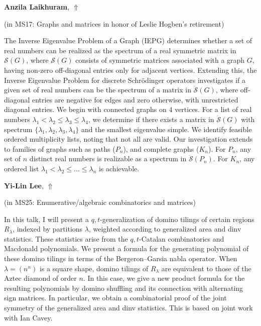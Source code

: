 \documentclass[ILAS2025-program.tex]{subfiles}
\begin{document}
\hypertarget{down0223}{}\begin{ilasabstract}
    
\textbf{Anzila Laikhuram},  \hfill \hyperlink{up0223}{$\Uparrow$}
    
    
(in {\color{mstitle}MS17: Graphs and matrices in honor of Leslie Hogben's retirement})
        
\mtskip
    The Inverse Eigenvalue Problem of a Graph (IEPG) determines whether a set of real numbers can be realized as the spectrum of a real symmetric matrix in $\mathcal{S}(G)$, where $\mathcal{S}(G)$ consists of symmetric matrices associated with a graph $G$, having non-zero off-diagonal entries only for adjacent vertices. Extending this, the Inverse Eigenvalue Problem for discrete Schr\"odinger operators investigates if a given set of real numbers can be the spectrum of a matrix in $\ddot{\mathcal{S}}(G)$, where off-diagonal entries are negative for edges and zero otherwise, with unrestricted diagonal entries. We begin with connected graphs on 4 vertices. For a list of real numbers $\lambda_1 < \lambda_2 \leq \lambda_3 \leq \lambda_4$, we determine if there exists a matrix in $\ddot{\mathcal{S}}(G)$ with spectrum $\{\lambda_1, \lambda_2, \lambda_3, \lambda_4\}$ and the smallest eigenvalue simple. We identify feasible ordered multiplicity lists, noting that not all are valid.   Our investigation extends to families of graphs such as paths ($P_n$), and complete graphs ($K_n$). For $P_n$, any set of $n$ distinct real numbers is realizable as a spectrum in $\ddot{\mathcal{S}}(P_n)$. For $K_n$, any ordered list $\lambda_1 < \lambda_2 \leq \dots \leq \lambda_n$ is achievable. 
\end{ilasabstract}
    

\hypertarget{down0225}{}\begin{ilasabstract}
    
\textbf{Yi-Lin Lee},  \hfill \hyperlink{up0225}{$\Uparrow$}
    
    
(in {\color{mstitle}MS25: Enumerative/algebraic combinatorics and matrices})
        
\mtskip
    In this talk, I will present a $q,t$-generalization of domino tilings of certain regions $R_\lambda$, indexed by partitions $\lambda$, weighted according to generalized area and dinv statistics. These statistics arise from the $q,t$-Catalan combinatorics and Macdonald polynomials. We present a formula for the generating polynomial of these domino tilings in terms of the Bergeron--Garsia nabla operator. When $\lambda = (n^n)$ is a square shape, domino tilings of $R_\lambda$ are equivalent to those of the Aztec diamond of order $n$. In this case, we give a new product formula for the resulting polynomials by domino shuffling and its connection with alternating sign matrices. In particular, we obtain a combinatorial proof of the joint symmetry of the generalized area and dinv statistics. This is based on joint work with Ian Cavey.
\end{ilasabstract}
    
\end{document}
